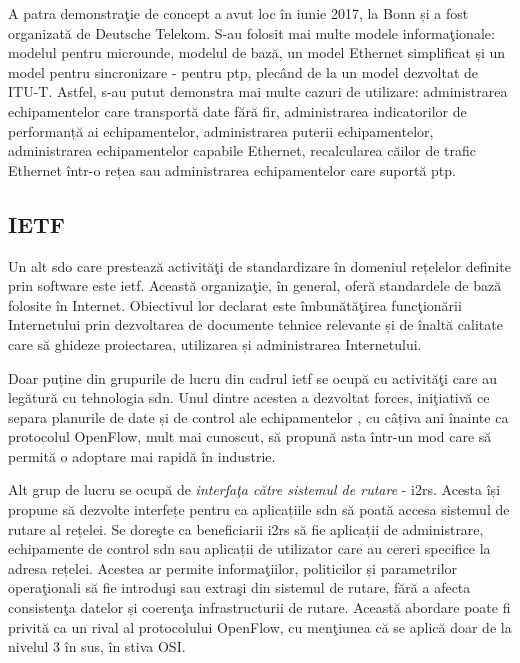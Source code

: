 A patra demonstraţie de concept a avut loc în iunie 2017, la Bonn și a fost organizată de Deutsche Telekom. S-au folosit mai multe modele informaţionale: modelul pentru microunde, modelul de bază, un model Ethernet simplificat și un model pentru sincronizare - pentru \gls{ptp}, plecând de la un model dezvoltat de ITU-T. Astfel, s-au putut demonstra mai multe cazuri de utilizare: administrarea echipamentelor care transportă date fără fir, administrarea indicatorilor de performanță ai echipamentelor, administrarea puterii echipamentelor, administrarea echipamentelor capabile Ethernet, recalcularea căilor de trafic Ethernet într-o rețea sau administrarea echipamentelor care suportă \gls{ptp}. 

\subsection{IETF}

Un alt \gls{sdo} care prestează activităţi de standardizare în domeniul rețelelor definite prin software este \gls{ietf}. Această organizaţie, în general, oferă standardele de bază folosite în Internet. Obiectivul lor declarat este îmbunătăţirea funcţionării Internetului prin dezvoltarea de documente tehnice relevante și de înaltă calitate care să ghideze proiectarea, utilizarea și administrarea Internetului.

Doar puține din grupurile de lucru din cadrul \gls{ietf} se ocupă cu activităţi care au legătură cu tehnologia \gls{sdn}. Unul dintre acestea a dezvoltat \gls{forces}, iniţiativă ce separa planurile de date și de control ale echipamentelor \cite{doria2010forwarding}, cu câțiva ani înainte ca protocolul OpenFlow, mult mai cunoscut, să propună asta într-un mod care să permită o adoptare mai rapidă în industrie.

Alt grup de lucru se ocupă de \textit{interfaţa către sistemul de rutare} - \gls{i2rs}. Acesta își propune să dezvolte interfețe pentru ca aplicațiile \gls{sdn} să poată accesa sistemul de rutare al rețelei. Se doreşte ca beneficiarii \gls{i2rs} să fie aplicații de administrare, echipamente de control \gls{sdn} sau aplicații de utilizator care au cereri specifice la adresa rețelei. Acestea ar permite informaţiilor, politicilor și parametrilor operaţionali să fie introduşi sau extraşi din sistemul de rutare, fără a afecta consistenţa datelor și coerenţa infrastructurii de rutare. Această abordare poate fi privită ca un rival al protocolului OpenFlow, cu menţiunea că se aplică doar de la nivelul 3 în sus, în stiva OSI.

